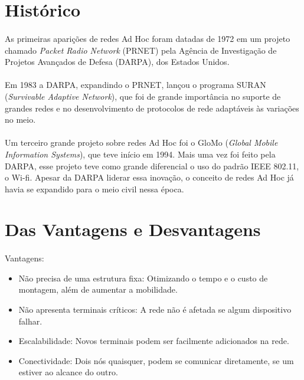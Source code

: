 \section{Histórico}
\paragraph{} As primeiras aparições de redes Ad Hoc foram datadas de 1972 em um projeto chamado \textit{Packet Radio Network} (PRNET) pela Agência de Investigação de Projetos Avançados de Defesa (DARPA), dos Estados Unidos.

\paragraph{} Em 1983 a DARPA, expandindo o PRNET, lançou o programa SURAN (\textit{Survivable Adaptive Network}), que foi de grande importância no suporte de grandes redes e no desenvolvimento de protocolos de rede adaptáveis às variações no meio.

\paragraph{} Um terceiro grande projeto sobre redes Ad Hoc foi o GloMo (\textit{Global Mobile Information Systems}), que teve início em 1994. Mais uma vez foi feito pela DARPA, esse projeto teve como grande diferencial o uso do padrão IEEE 802.11, o Wi-fi. Apesar da DARPA liderar essa inovação, o conceito de redes Ad Hoc já havia se expandido para o meio civil nessa época.

\section{Das Vantagens e Desvantagens}
\paragraph{} Vantagens:

\begin{itemize}
   \item Não precisa de uma estrutura fixa:  Otimizando o tempo e o custo de montagem, além de aumentar a mobilidade.
   \item Não apresenta terminais críticos:  A rede não é afetada se algum dispositivo falhar.
   \item Escalabilidade:  Novos terminais podem ser facilmente adicionados na rede.
   \item Conectividade: Dois nós quaisquer, podem se comunicar diretamente, se um estiver ao alcance do outro. 
   
\end{itemize}
 
